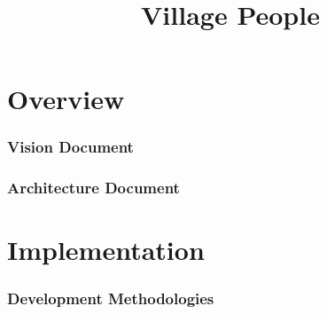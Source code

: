 \documentclass[a4paper,10pt]{book}
\title{Village People}
\begin{document}
\maketitle
\part{Overview}
	\section{Vision Document}
    		
	\section{Architecture Document}
		
\part{Implementation}
	\section{Development Methodologies}
		
\end{document}
